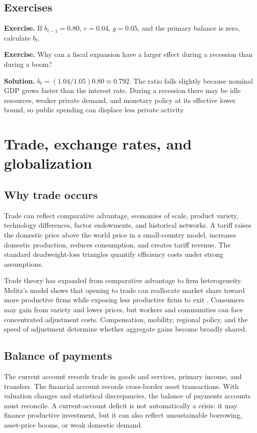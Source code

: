 \documentclass[11pt,oneside,openany]{book}
\newcommand{\exercise}[1]{\textbf{Exercise.} #1}
\newcommand{\solution}[1]{\textbf{Solution.} #1}
\begin{document}
\section{Exercises}

\exercise{If $b_{t-1}=0.80$, $r=0.04$, $g=0.05$, and the primary balance is zero, calculate $b_t$.}

\exercise{Why can a fiscal expansion have a larger effect during a recession than during a boom?}

\solution{$b_t=(1.04/1.05)0.80\approx0.792$. The ratio falls slightly because nominal GDP grows faster than the interest rate. During a recession there may be idle resources, weaker private demand, and monetary policy at its effective lower bound, so public spending can displace less private activity.}

\chapter{Trade, exchange rates, and globalization}
\label{ch:trade}

\section{Why trade occurs}

Trade can reflect comparative advantage, economies of scale, product variety, technology differences, factor endowments, and historical networks. A tariff raises the domestic price above the world price in a small-country model, increases domestic production, reduces consumption, and creates tariff revenue. The standard deadweight-loss triangles quantify efficiency costs under strong assumptions.

Trade theory has expanded from comparative advantage to firm heterogeneity. Melitz's model shows that opening to trade can reallocate market share toward more productive firms while exposing less productive firms to exit \cite{melitz2003}. Consumers may gain from variety and lower prices, but workers and communities can face concentrated adjustment costs. Compensation, mobility, regional policy, and the speed of adjustment determine whether aggregate gains become broadly shared.

\section{Balance of payments}

The current account records trade in goods and services, primary income, and transfers. The financial account records cross-border asset transactions. With valuation changes and statistical discrepancies, the balance of payments accounts must reconcile. A current-account deficit is not automatically a crisis: it may finance productive investment, but it can also reflect unsustainable borrowing, asset-price booms, or weak domestic demand.
\end{document}
